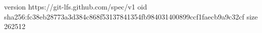 version https://git-lfs.github.com/spec/v1
oid sha256:fc38eb28773a3d384c868f53137841354fb984031400899ccf1faecb9a9c32cf
size 262512
